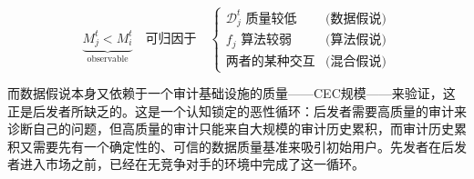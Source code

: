 \documentclass[12pt,a4paper]{ctexart}
\theoremstyle{definition}
\theoremstyle{remark}
\begin{document}
\begin{equation}
\underbrace{M_j^t < M_i^t}_{\text{observable}} \quad \text{可归因于} \quad \begin{cases}
\mathcal{D}_j^t \text{ 质量较低} &\text{(数据假说)}\\
f_j \text{ 算法较弱} &\text{(算法假说)}\\
\text{两者的某种交互} &\text{(混合假说)}
\end{cases}
\end{equation}

而数据假说本身又依赖于一个审计基础设施的质量——CEC规模——来验证，这正是后发者所缺乏的。这是一个认知锁定的恶性循环：后发者需要高质量的审计来诊断自己的问题，但高质量的审计只能来自大规模的审计历史累积，而审计历史累积又需要先有一个确定性的、可信的数据质量基准来吸引初始用户。先发者在后发者进入市场之前，已经在无竞争对手的环境中完成了这一循环。
\end{document}
